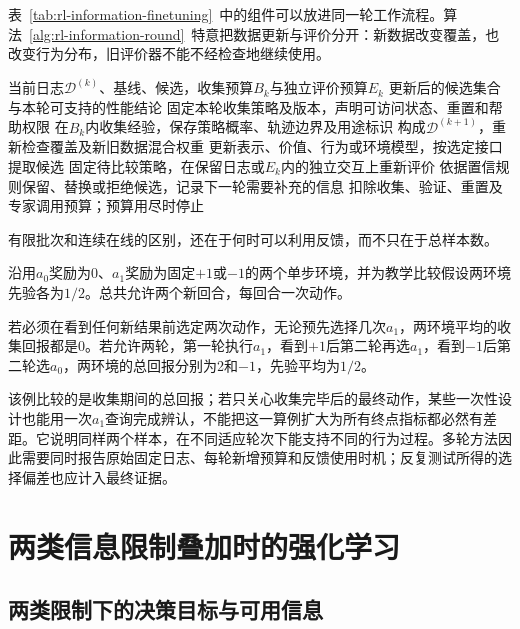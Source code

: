 表~\ref{tab:rl-information-finetuning}~中的组件可以放进同一轮工作流程。算法~\ref{alg:rl-information-round}~特意把数据更新与评价分开：新数据改变覆盖，也改变行为分布，旧评价器不能不经检查地继续使用。

\begin{algorithm}[一轮有限经验修正]
  \label{alg:rl-information-round}
  \begin{algorithmic}[1]
    \Require 当前日志$\mathcal D^{(k)}$、基线、候选，收集预算$B_k$与独立评价预算$E_k$
    \Ensure 更新后的候选集合与本轮可支持的性能结论
    \State 固定本轮收集策略及版本，声明可访问状态、重置和帮助权限
    \State 在$B_k$内收集经验，保存策略概率、轨迹边界及用途标识
    \State 构成$\mathcal D^{(k+1)}$，重新检查覆盖及新旧数据混合权重
    \State 更新表示、价值、行为或环境模型，按选定接口提取候选
    \State 固定待比较策略，在保留日志或$E_k$内的独立交互上重新评价
    \State 依据置信规则保留、替换或拒绝候选，记录下一轮需要补充的信息
    \State 扣除收集、验证、重置及专家调用预算；预算用尽时停止
  \end{algorithmic}
\end{algorithm}

有限批次和连续在线的区别，还在于何时可以利用反馈，而不只在于总样本数。

\begin{example}[相同两次查询与不同适应轮次]
  \label{ex:rl-information-batches}
  沿用$a_0$奖励为0、$a_1$奖励为固定$+1$或$-1$的两个单步环境，并为教学比较假设两环境先验各为$1/2$。总共允许两个新回合，每回合一次动作。

  若必须在看到任何新结果前选定两次动作，无论预先选择几次$a_1$，两环境平均的收集回报都是0。若允许两轮，第一轮执行$a_1$，看到$+1$后第二轮再选$a_1$，看到$-1$后第二轮选$a_0$，两环境的总回报分别为2和$-1$，先验平均为$1/2$。
\end{example}

该例比较的是收集期间的总回报；若只关心收集完毕后的最终动作，某些一次性设计也能用一次$a_1$查询完成辨认，不能把这一算例扩大为所有终点指标都必然有差距。它说明同样两个样本，在不同适应轮次下能支持不同的行为过程。多轮方法因此需要同时报告原始固定日志、每轮新增预算和反馈使用时机；反复测试所得的选择偏差也应计入最终证据。

\section{两类信息限制叠加时的强化学习}
\label{sec:rl-information-combined}

\subsection{两类限制下的决策目标与可用信息}
\label{sec:rl-information-combined-target}

